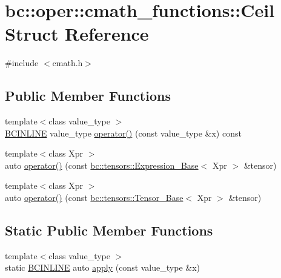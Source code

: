 \hypertarget{structbc_1_1oper_1_1cmath__functions_1_1Ceil}{}\section{bc\+:\+:oper\+:\+:cmath\+\_\+functions\+:\+:Ceil Struct Reference}
\label{structbc_1_1oper_1_1cmath__functions_1_1Ceil}


{\ttfamily \#include $<$cmath.\+h$>$}

\subsection*{Public Member Functions}
\begin{DoxyCompactItemize}
\item 
{\footnotesize template$<$class value\+\_\+type $>$ }\\\hyperlink{common_8h_a6699e8b0449da5c0fafb878e59c1d4b1}{B\+C\+I\+N\+L\+I\+NE} value\+\_\+type \hyperlink{structbc_1_1oper_1_1cmath__functions_1_1Ceil_a32f628d13c73057bbe5f554981bf8e87}{operator()} (const value\+\_\+type \&x) const
\item 
{\footnotesize template$<$class Xpr $>$ }\\auto \hyperlink{structbc_1_1oper_1_1cmath__functions_1_1Ceil_ab4487a71061a0b560d0cfc571232ad8e}{operator()} (const \hyperlink{classbc_1_1tensors_1_1Expression__Base}{bc\+::tensors\+::\+Expression\+\_\+\+Base}$<$ Xpr $>$ \&tensor)
\item 
{\footnotesize template$<$class Xpr $>$ }\\auto \hyperlink{structbc_1_1oper_1_1cmath__functions_1_1Ceil_a76594ed82676bc601f2c293c2872b095}{operator()} (const \hyperlink{classbc_1_1tensors_1_1Tensor__Base}{bc\+::tensors\+::\+Tensor\+\_\+\+Base}$<$ Xpr $>$ \&tensor)
\end{DoxyCompactItemize}
\subsection*{Static Public Member Functions}
\begin{DoxyCompactItemize}
\item 
{\footnotesize template$<$class value\+\_\+type $>$ }\\static \hyperlink{common_8h_a6699e8b0449da5c0fafb878e59c1d4b1}{B\+C\+I\+N\+L\+I\+NE} auto \hyperlink{structbc_1_1oper_1_1cmath__functions_1_1Ceil_ae7414a021751685ffe1acd8a3f4f89f5}{apply} (const value\+\_\+type \&x)
\end{DoxyCompactItemize}



